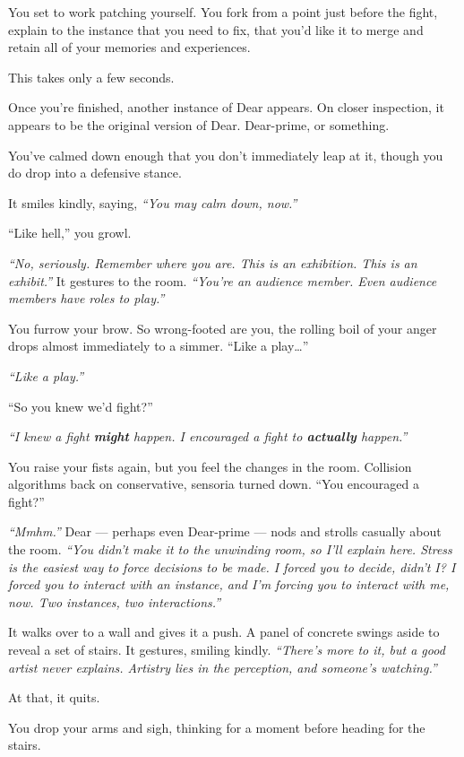 You set to work patching yourself. You fork from a point just before the fight, explain to the instance that you need to fix, that you'd like it to merge and retain all of your memories and experiences.

This takes only a few seconds.

Once you're finished, another instance of Dear appears. On closer inspection, it appears to be the original version of Dear. Dear-prime, or something.

You've calmed down enough that you don't immediately leap at it, though you do drop into a defensive stance.

It smiles kindly, saying, \emph{``You may calm down, now.''}

``Like hell,'' you growl.

\emph{``No, seriously. Remember where you are. This is an exhibition. This is an exhibit.''} It gestures to the room. \emph{``You're an audience member. Even audience members have roles to play.''}

You furrow your brow. So wrong-footed are you, the rolling boil of your anger drops almost immediately to a simmer. ``Like a play\ldots{}''

\emph{``Like a play.''}

``So you knew we'd fight?''

\emph{``I knew a fight \textbf{might} happen. I encouraged a fight to \textbf{actually} happen.''}

You raise your fists again, but you feel the changes in the room. Collision algorithms back on conservative, sensoria turned down. ``You encouraged a fight?''

\emph{``Mmhm.''} Dear --- perhaps even Dear-prime --- nods and strolls casually about the room. \emph{``You didn't make it to the unwinding room, so I'll explain here. Stress is the easiest way to force decisions to be made. I forced you to decide, didn't I? I forced you to interact with an instance, and I'm forcing you to interact with me, now. Two instances, two interactions.''}

It walks over to a wall and gives it a push. A panel of concrete swings aside to reveal a set of stairs.  It gestures, smiling kindly. \emph{``There's more to it, but a good artist never explains. Artistry lies in the perception, and someone's watching.''}

At that, it quits.

You drop your arms and sigh, thinking for a moment before heading for the stairs.

